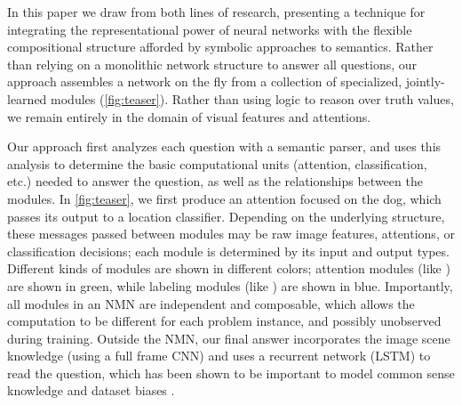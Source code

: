 In this paper we draw from both lines of research, presenting a technique for
integrating the representational power of neural networks with the flexible
compositional structure afforded by symbolic approaches to semantics.  Rather
than relying on a monolithic network structure to answer all questions, our
approach assembles a network on the fly from a collection of specialized,
jointly-learned modules (\autoref{fig:teaser}). Rather than using logic to
reason over truth values, we remain entirely in the domain of visual features
and attentions.

Our approach first analyzes
each question with a semantic parser, and uses this analysis to
determine the basic computational units (attention, classification, etc.) needed
to answer the question, as well as the relationships between the modules. In
\autoref{fig:teaser}, we first produce an attention focused on the dog, which
passes its output to
a location classifier. Depending on the underlying structure, these messages
passed between modules may be raw image features, attentions, or classification
decisions; each module is determined by its input and output types.
Different kinds of modules are shown in different colors; attention modules
(like ) are shown in green, while labeling modules (like
) are shown in blue.
Importantly, all modules in an NMN are independent and composable, which allows
the computation to be different for each problem instance, and possibly
unobserved during training. 
Outside the NMN, our final answer incorporates the image scene knowledge
(using a full frame CNN) and uses a recurrent network (LSTM) to read the
question, which has been shown to be important to model common sense knowledge
and dataset biases \cite{malinowski15iccv}.


